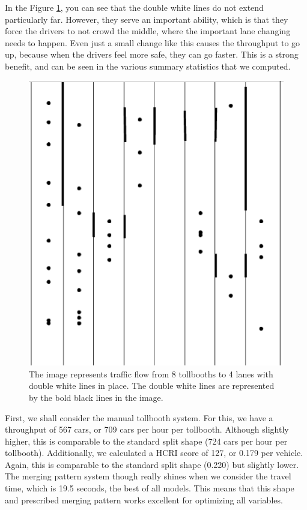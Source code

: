\documentclass[a4paper, 11pt]{article}
\begin{document}
In the Figure \ref{fig:merge_patterns}, you can see that the double white lines do not extend particularly far. However, they serve an important ability, which is that they force the drivers to not crowd the middle, where the important lane changing needs to happen. Even just a small change like this causes the throughput to go up, because when the drivers feel more safe, they can go faster. This is a strong benefit, and can be seen in the various summary statistics that we computed. 



\begin{figure}[H]
\begin{center}
\includegraphics[scale=0.27]{Images/DoubleWhiteLines.png}
\end{center}
\caption{The image represents traffic flow from 8 tollbooths to 4 lanes with double white lines in place. The double white lines are represented by the bold black lines in the image. }
\label{fig:merge_patterns}
\end{figure}

First, we shall consider the manual tollbooth system. For this, we have a throughput of 567 cars, or 709 cars per hour per tollbooth. Although slightly higher, this is comparable to the standard split shape (724 cars per hour per tollbooth). Additionally, we calculated a HCRI score of 127, or 0.179 per vehicle. Again, this is comparable to the standard split shape (0.220) but slightly lower. The merging pattern system though really shines when we consider the travel time, which is 19.5 seconds, the best of all models. This means that this shape and prescribed merging pattern works excellent for optimizing all variables. 
\end{document}
